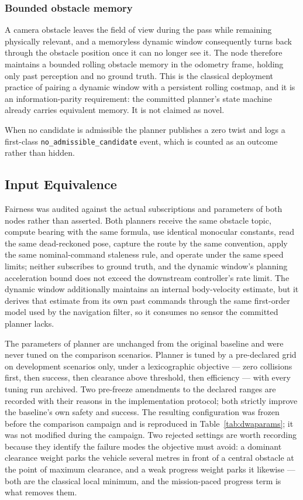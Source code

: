 \subsubsection{Bounded obstacle memory}
A camera obstacle leaves the field of view during the pass while remaining
physically relevant, and a memoryless dynamic window consequently turns back
through the obstacle position once it can no longer see it. The node
therefore maintains a bounded rolling obstacle memory in the odometry frame,
holding only past perception and no ground truth. This is the classical
deployment practice of pairing a dynamic window with a persistent rolling
costmap, and it is an information-parity requirement: the committed planner's
state machine already carries equivalent memory. It is not claimed as novel.

When no candidate is admissible the planner publishes a zero twist and logs a
first-class \texttt{no\_admissible\_candidate} event, which is counted as an
outcome rather than hidden.

\subsection{Input Equivalence}

Fairness was audited against the actual subscriptions and parameters of both
nodes rather than asserted. Both planners receive the same obstacle topic,
compute bearing with the same formula, use identical monocular constants,
read the same dead-reckoned pose, capture the route by the same convention,
apply the same nominal-command staleness rule, and operate under the same
speed limits; neither subscribes to ground truth, and the dynamic window's
planning acceleration bound does not exceed the downstream controller's rate
limit. The dynamic window additionally maintains an internal body-velocity
estimate, but it derives that estimate from its own past commands through the
same first-order model used by the navigation filter, so it consumes no
sensor the committed planner lacks.

The parameters of planner \PC{} are unchanged from the original baseline and
were never tuned on the comparison scenarios. Planner \PD{} is tuned by a
pre-declared grid on development scenarios only, under a lexicographic
objective --- zero collisions first, then success, then clearance above
threshold, then efficiency --- with every tuning run archived. Two pre-freeze
amendments to the declared ranges are recorded with their reasons in the
implementation protocol; both strictly improve the baseline's own safety and
success. The resulting configuration was frozen before the comparison
campaign and is reproduced in Table~\ref{tab:dwaparams}; it was not modified
during the campaign. Two rejected settings are worth recording because they
identify the failure modes the objective must avoid: a dominant clearance
weight parks the vehicle several metres in front of a central obstacle at the
point of maximum clearance, and a weak progress weight parks it likewise ---
both are the classical local minimum, and the mission-paced progress term is
what removes them.



